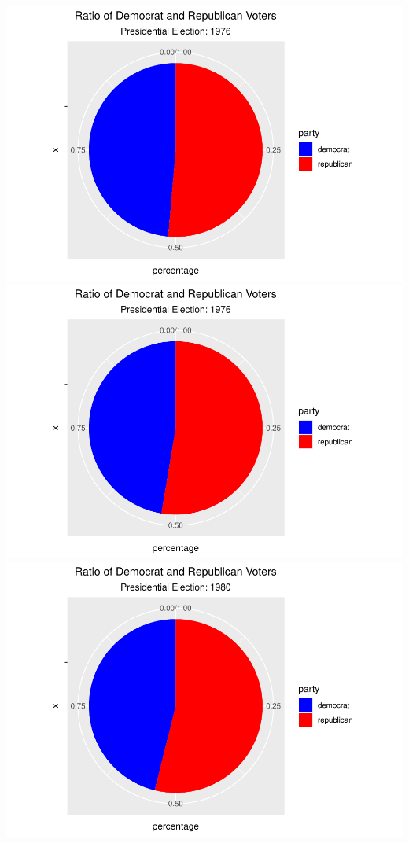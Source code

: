 \documentclass[
]{article}
\begin{document}
\includegraphics{election_files/figure-latex/anim-7.pdf}
\includegraphics{election_files/figure-latex/anim-8.pdf}
\includegraphics{election_files/figure-latex/anim-9.pdf}
\end{document}
